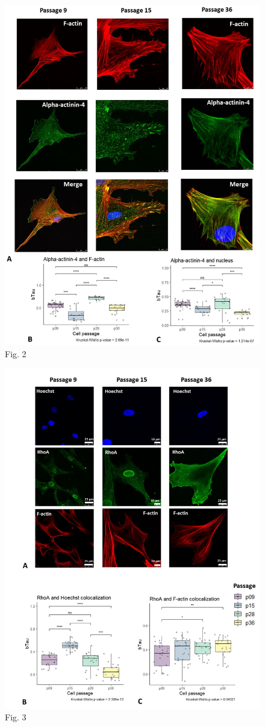 \documentclass[alpha-refs]{wiley-article}
\begin{document}
\begin{figure}[hbt!]
\centering
\includegraphics[width=0.9\linewidth]{alpha-actinin-4.jpg}
\caption{Fig. 2}
\end{figure}

\begin{figure}[hbt!]
  \includegraphics[width=0.9\linewidth]{rho.jpg}
  \caption{Fig. 3}
  \centering
\end{figure}
\end{document}
